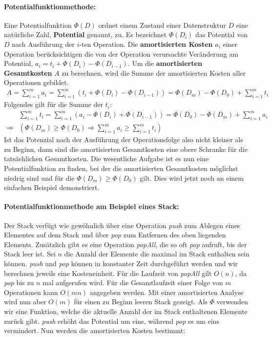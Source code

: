 \documentclass[a4paper,12pt]{article}
\begin{document}
\paragraph{Potentialfunktionmethode:} \label{potentialfunktionsmethode} Eine Potentialfunktion $\Phi(D)$ ordnet einem Zustand einer Datenstruktur $D$ eine natürliche Zahl, \textbf{Potential} genannt, zu. Es bezeichnet $\Phi(D_i)$ das Potential von $D$ nach Ausführung der $i$-ten Operation. Die \textbf{amortisierten Kosten} $a_i$ einer Operation berücksichtigen die von der Operation verursachte Veränderung am Potential, \mbox{$a_i = t_i + \Phi(D_{i}) - \Phi(D_{i-1})$}. Um die \textbf{amortisierten Gesamtkosten} $A$ zu berechnen, wird die Summe der amortisierten Kosten aller Operationen gebildet. 
\begin{align*}
A = \sum_{i = 1}^{m} a_i =  \sum_{i = 1}^{m} \left(t_i + \Phi\left(D_{i}\right) - \Phi\left(D_{i-1}\right)\right) = \Phi\left(D_{m}\right) - \Phi\left(D_{0}\right) + \sum_{i = 1}^{m} t_i 
\end{align*}
Folgendes gilt für die Summe der $t_i$:
\begin{align*}
&\sum_{i = 1}^{m} t_i =  \sum_{i = 1}^{m} \left(a_i - \Phi\left(D_{i}\right) + \Phi\left(D_{i-1}\right)\right) = \Phi\left(D_{0}\right) - \Phi\left(D_{m}\right) + \sum_{i = 1}^{m} a_i \\
\Rightarrow &\left( \Phi\left(D_{m}\right) \geq \Phi\left(D_{0}\right) \Rightarrow \sum_{i = 1}^{m} a_i \geq \sum_{i = 1}^{m} t_i \right)
\end{align*}
Ist das Potenzial nach der Ausführung der Operationsfolge also nicht kleiner als zu Beginn, dann sind die amortisierten Gesamtkosten eine obere Schranke für die tatsächlichen Gesamtkosten. Die wesentliche Aufgabe ist es nun eine Potentialfunktion zu finden, bei der die amortisierten Gesamtkosten möglichst niedrig sind und für die $\Phi\left(D_{m}\right) \geq \Phi\left(D_{0}\right)$ gilt. Dies wird jetzt noch an einem einfachen Beispiel demonstriert.

\paragraph{Potentialfunktionmethode am Beispiel eines Stack:} 
Der Stack verfügt wie gewöhnlich über eine Operation \textit{push} zum Ablegen eines Elementes auf dem Stack und über \textit{pop} zum Entfernen des oben liegenden Elements. Zusätzlich gibt es eine Operation \textit{popAll}, die so oft \textit{pop} aufruft, bis der Stack leer ist. Sei $n$ die Anzahl der Elemente die maximal im Stack enthalten sein können. \textit{push} und \textit{pop} können in konstanter Zeit durchgeführt werden und wir berechnen jeweils eine Kosteneinheit. Für die Laufzeit von \textit{popAll} gilt $O(n)$, da \textit{pop} bis zu $n$ mal aufgerufen wird. Für die Gesamtlaufzeit einer Folge von $m$ Operationen kann $O(mn)$ angegeben werden. Mit einer amortisierten Analyse wird nun aber $O(m)$ für einen zu Beginn leeren Stack gezeigt. Als $\Phi$ verwenden wir eine Funktion, welche die aktuelle Anzahl der im Stack enthaltenen Elemente zurück gibt. \textit{push} erhöht das Potential um eins, während \textit{pop} es um eins vermindert. Nun werden die amortisierten Kosten bestimmt: 
\end{document}
